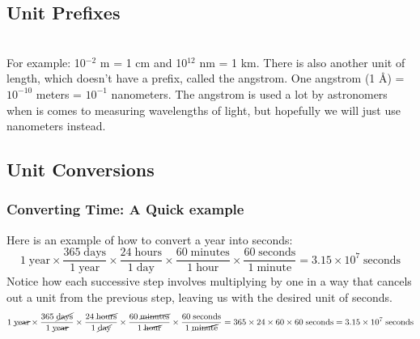 \subsection*{Unit Prefixes}
\\

For example: 10$^{-2}$ m = 1 cm and 10$^{12}$ nm = 1 km. There is also another unit of length, which doesn't have a prefix, called the angstrom. One angstrom (1 \AA) = $10^{-10}$ meters = $10^{-1}$ nanometers. The angstrom is used a lot by astronomers when is comes to measuring wavelengths of light, but hopefully we will just use nanometers instead.

\subsection*{Unit Conversions}
\subsubsection*{Converting Time: A Quick example}
	Here is an example of how to convert a year into seconds:
	\begin{equation}\label{eqn:year2sec}
	1\;\textrm{year}\times\frac{365\;\textrm{days}}{1\;\textrm{year}}\times\frac{24\;\textrm{hours}}{1\;\textrm{day}}\times\frac{60\;\textrm{minutes}}{1\;\textrm{hour}}\times\frac{60\;\textrm{seconds}}{1\;\textrm{minute}}=3.15\times 10^7\;\textrm{seconds}
	\end{equation}
	Notice how each successive step involves multiplying by one in a way that cancels out a unit from the previous step, leaving us with the desired unit of seconds.
	$$1\;\cancel{\textrm{year}}\times\frac{365\;\cancel{\textrm{days}}}{1\;\cancel{\textrm{year}}}\times\frac{24\;\cancel{\textrm{hours}}}{1\;\cancel{\textrm{day}}}\times\frac{60\;\cancel{\textrm{minutes}}}{1\;\cancel{\textrm{hour}}}\times\frac{60\;\textrm{seconds}}{1\;\cancel{\textrm{minute}}}=365\times 24\times 60\times 60\; {\rm seconds}= 3.15\times 10^7\;\textrm{seconds}$$
	
